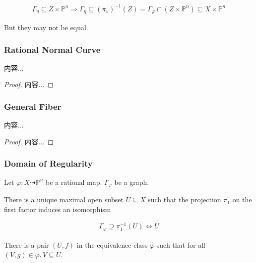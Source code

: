 \documentclass[Total.tex]{subfiles}
\begin{document}
		\begin{gather*}
			\Gamma_\eta\subseteq Z\times \mathbb{P}^n\Rightarrow \Gamma_\eta\subseteq (\pi_1)^{-1}(Z)=\Gamma_\varphi\cap (Z\times \mathbb{P}^n)\subseteq X\times \mathbb{P}^n
		\end{gather*}
		
		But they may not be equal. 
		
		\subsubsection{Rational Normal Curve}
		
		\begin{proposition}
			内容...
		\end{proposition}
		
		\begin{proof}
			内容...
		\end{proof}
		
		\subsubsection{General Fiber}
		
		\begin{proposition}
			内容...
		\end{proposition}
		
		\begin{proof}
			内容...
		\end{proof}
		
		\subsubsection{Domain of Regularity}
		
		\begin{proposition}
			Let $\varphi:X\dashrightarrow \mathbb{P}^n$ be a rational map. $\Gamma_\varphi$ be a graph. 
			
			There is a unique maximal open subset $U\subseteq X$ such that the projection $\pi_1$ on the first factor induces an isomorphism
			
			\begin{gather*}
				\Gamma_\varphi\supseteq \pi_1^{-1}(U)\Leftrightarrow U
			\end{gather*}
			
			There is a pair $(U,f)$ in the equivalence class $\varphi$ such that for all $(V,g)\in \varphi,V\subseteq U$.
		\end{proposition}
		
\end{document}
